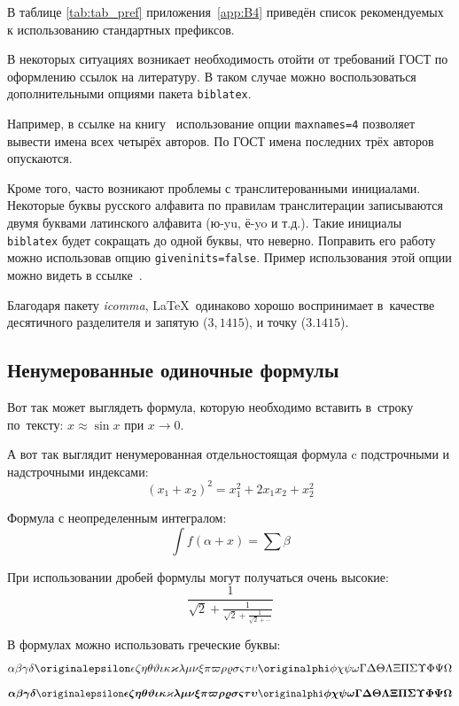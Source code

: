 В таблице \cref{tab:tab_pref} приложения~\cref{app:B4} приведён список рекомендуемых
к использованию стандартных префиксов.

В некоторых ситуациях возникает необходимость отойти от требований ГОСТ по оформлению ссылок на
литературу.
В таком случае можно воспользоваться дополнительными опциями пакета \verb+biblatex+.

Например, в ссылке на книгу~\cite{sobenin_kdv} использование опции \verb+maxnames=4+ позволяет
вывести имена всех четырёх авторов.
По ГОСТ имена последних трёх авторов опускаются.

Кроме того, часто возникают проблемы с транслитерованными инициалами. Некоторые буквы русского
алфавита по правилам транслитерации записываются двумя буквами латинского алфавита (ю-yu, ё-yo и
т.д.).
Такие инициалы \verb+biblatex+ будет сокращать до одной буквы, что неверно.
Поправить его работу можно использовав опцию \verb+giveninits=false+.
Пример использования этой опции можно видеть в ссылке~\cite{initials}.


Благодаря пакету \textit{icomma}, \LaTeX~одинаково хорошо воспринимает
в~качестве десятичного разделителя и запятую (\(3,1415\)), и точку (\(3.1415\)).

\subsection{Ненумерованные одиночные формулы}\label{subsec:ch1/sec3/sub1}

Вот так может выглядеть формула, которую необходимо вставить в~строку
по~тексту: \(x \approx \sin x\) при \(x \to 0\).

А вот так выглядит ненумерованная отдельностоящая формула c подстрочными
и надстрочными индексами:
\[
    (x_1+x_2)^2 = x_1^2 + 2 x_1 x_2 + x_2^2
\]

Формула с неопределенным интегралом:
\[
    \int f(\alpha+x)=\sum\beta
\]

При использовании дробей формулы могут получаться очень высокие:
\[
    \frac{1}{\sqrt{2}+
        \displaystyle\frac{1}{\sqrt{2}+
            \displaystyle\frac{1}{\sqrt{2}+\cdots}}}
\]

В формулах можно использовать греческие буквы:
\[
    \alpha\beta\gamma\delta\originalepsilon\epsilon\zeta\eta\theta%
    \vartheta\iota\kappa\varkappa\lambda\mu\nu\xi\pi\varpi\rho\varrho%
    \sigma\varsigma\tau\upsilon\originalphi\phi\chi\psi\omega\Gamma\Delta%
    \Theta\Lambda\Xi\Pi\Sigma\Upsilon\Phi\Psi\Omega
\]
\[%
    \boldsymbol{\alpha\beta\gamma\delta\originalepsilon\epsilon\zeta\eta%
        \theta\vartheta\iota\kappa\varkappa\lambda\mu\nu\xi\pi\varpi\rho%
        \varrho\sigma\varsigma\tau\upsilon\originalphi\phi\chi\psi\omega\Gamma%
        \Delta\Theta\Lambda\Xi\Pi\Sigma\Upsilon\Phi\Psi\Omega}
\]


